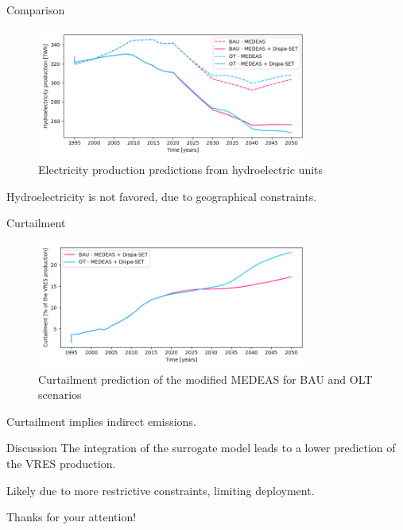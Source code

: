 \documentclass{beamer}
\begin{document}
    \begin{frame}{Comparison}
        \begin{figure}[h]
            \centering
            \includegraphics[width=0.8\textwidth]{../resources/images/electricity-production-hydro.png}
            \caption{Electricity production predictions from hydroelectric units}
            \label{fig:electricity-production-hydro}
        \end{figure}
        Hydroelectricity is not favored, due to geographical constraints.
    \end{frame}

    \begin{frame}{Curtailment}
        \begin{figure}[h]
            \centering
            \includegraphics[width=0.8\textwidth]{../resources/images/electricity-production-curtailed.png}
            \caption{Curtailment prediction of the modified MEDEAS for BAU and OLT scenarios}
        \end{figure}

        Curtailment implies indirect emissions.
    \end{frame}

    \begin{frame}{Discussion}
        The integration of the surrogate model leads to a lower prediction of the VRES production.
        
        Likely due to more restrictive constraints, limiting deployment.
    \end{frame}

    \begin{frame}
        Thanks for your attention!
    \end{frame}
\end{document}
